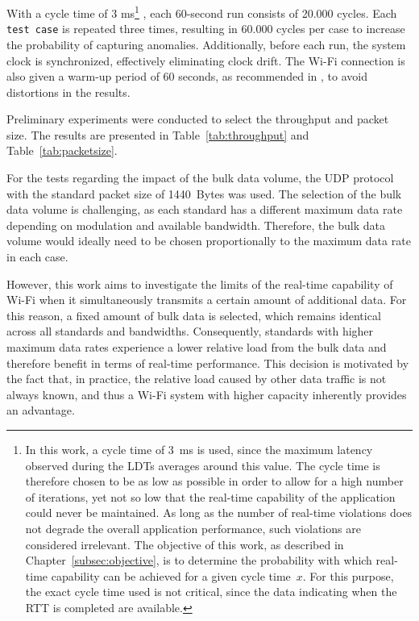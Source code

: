 With a cycle time of 3 ms\footnote{In this work, a cycle time of 3~ms is used, since the maximum latency observed during the \acp{LDT} averages around this value. 
The cycle time is therefore chosen to be as low as possible in order to allow for a high number of iterations, yet not so low that the real-time capability of the application could never be maintained. 
As long as the number of real-time violations does not degrade the overall application performance, such violations are considered irrelevant. 
The objective of this work, as described in Chapter~\ref{subsec:objective}, is to determine the probability with which real-time capability can be achieved for a given cycle time~$x$. 
For this purpose, the exact cycle time used is not critical, since the data indicating when the \ac{RTT} is completed are available.}
, each 60-second run consists of 20.000 cycles.  
Each \texttt{test case} is repeated three times, resulting in 60.000 cycles per case to increase the probability of capturing anomalies.  
Additionally, before each run, the system clock is synchronized, effectively eliminating clock drift.  
The Wi-Fi connection is also given a warm-up period of 60 seconds, as recommended in \cite[Chap.~3.3.3.14]{alexander-bmwg-wlan-switch-meth-01}, to avoid distortions in the results.  

Preliminary experiments were conducted to select the throughput and packet size.  
The results are presented in Table~\ref{tab:throughput} and Table~\ref{tab:packetsize}.  

For the tests regarding the impact of the bulk data volume, the \ac{UDP} protocol with the standard packet size of 1440~Bytes was used.  
The selection of the bulk data volume is challenging, as each standard has a different maximum data rate depending on modulation and available bandwidth.  
Therefore, the bulk data volume would ideally need to be chosen proportionally to the maximum data rate in each case.  

However, this work aims to investigate the limits of the real-time capability of Wi-Fi when it simultaneously transmits a certain amount of additional data.  
For this reason, a fixed amount of bulk data is selected, which remains identical across all standards and bandwidths.  
Consequently, standards with higher maximum data rates experience a lower relative load from the bulk data and therefore benefit in terms of real-time performance.  
This decision is motivated by the fact that, in practice, the relative load caused by other data traffic is not always known, and thus a Wi-Fi system with higher capacity inherently provides an advantage.  

